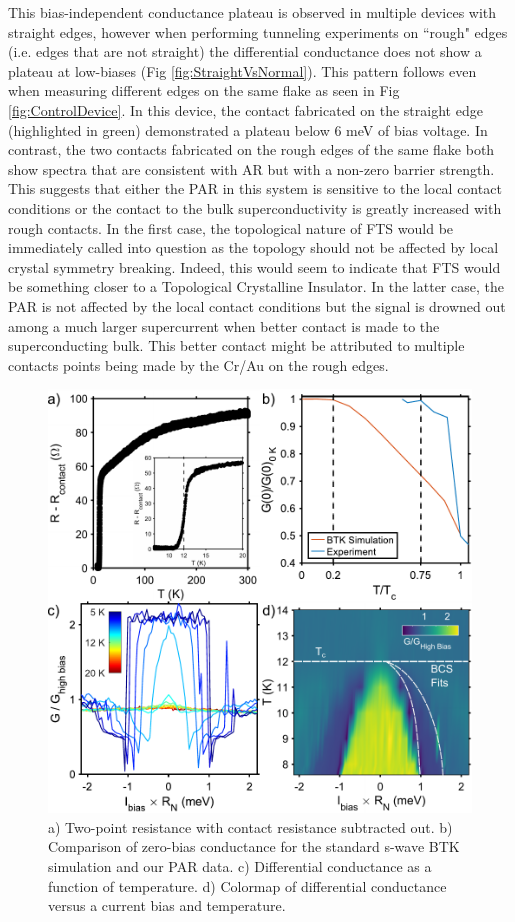 This bias-independent conductance plateau is observed in multiple devices with straight edges, however when performing tunneling experiments on ``rough" edges (i.e. edges that are not straight) the differential conductance does not show a plateau at low-biases (Fig \ref{fig:StraightVsNormal}). This pattern follows even when measuring different edges on the same flake as seen in Fig \ref{fig:ControlDevice}. In this device, the contact fabricated on the straight edge (highlighted in green) demonstrated a plateau below 6 meV of bias voltage. In contrast, the two contacts fabricated on the rough edges of the same flake both show spectra that are consistent with \ac{AR} but with a non-zero barrier strength. This suggests that either the \ac{PAR} in this system is sensitive to the local contact conditions or the contact to the bulk superconductivity is greatly increased with rough contacts. In the first case, the topological nature of \ac{FTS} would be immediately called into question as the topology should not be affected by local crystal symmetry breaking. Indeed, this would seem to indicate that \ac{FTS} would be something closer to a Topological Crystalline Insulator. In the latter case, the \ac{PAR} is not affected by the local contact conditions but the signal is drowned out among a much larger supercurrent when better contact is made to the superconducting bulk. This better contact might be attributed to multiple contacts points being made by the Cr/Au on the rough edges.\par
\begin{figure}
    \centering
    \includegraphics[width = \textwidth]{Chap4/Figures/Temperature.pdf}
    \caption{a) Two-point resistance with contact resistance subtracted out. b) Comparison of zero-bias conductance for the standard s-wave BTK simulation and our \ac{PAR} data. c) Differential conductance as a function of temperature. d) Colormap of differential conductance versus a current bias and temperature.}
    \label{fig:PARTemp}
\end{figure}
